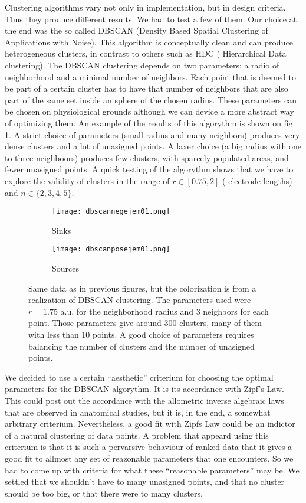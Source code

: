 \documentclass{article}
\begin{document}
Clustering algorithms vary not only in implementation, but in design criteria.
Thus they produce different results. We had to test a few of them. Our choice at the
end was the so called DBSCAN (Density Based Spatial Clustering of Applications with Noise).
This algorithm is conceptually clean and can produce heterogeneous clusters, in contrast
to others such as HDC ( Hierarchical Data clustering). The DBSCAN clustering depends
on two parameters: a radio of neighborhood and a minimal number of neighbors. Each
point that is deemed to be part of a certain cluster has to have that number of neighbors
that are also part of the same set inside an sphere of the chosen radius. These
parameters can be chosen on physiological grounds although we can device a more
abstract way of optimizing them. An example of the results of this
algorythm is shown on fig. \ref{puntoscluster}.
A strict choice of parameters (small radius and many neighbors) produces
very dense clusters and a lot of unasigned points. A laxer choice (a big radius
with one to three neighboors) produces few clusters, with sparcely populated
areas,  and fewer unasigned points. A quick testing of the algorythm 
shows that we have to explore the validity of clusters in the range of
$r \in [0.75, 2 ]$ ( electrode lengths) and $ n \in \lbrace 2,3,4,5 \rbrace$.


\begin{figure}[h]
\centering
\begin{subfigure}{0.40\textwidth}
\texttt{[image: dbscannegejem01.png]}
\caption{Sinks}
\end{subfigure}
\begin{subfigure}{0.40\textwidth}
\texttt{[image: dbscanposejem01.png]}
\caption{Sources}
\end{subfigure}

\caption{Same data as in previous figures, but the colorization is
  from a realization of DBSCAN clustering. The parameters used were
  $r=1.75$ a.u. for the neighborhood radius and 3 neighbors for each point.
  Those parameters give around 300 clusters, many of them with less than
  10 points. A good choice of parameters requires balancing
  the number of clusters and the number of unasigned points. 
}\label{puntoscluster}


\end{figure}


We decided to use a certain ``aesthetic'' criterium for choosing the optimal parameters
for the DBSCAN algorythm.  It is its accordance with Zipf's Law.  This could post out
the accordance with the allometric inverse algebraic laws that are observed in
anatomical studies, but it is, in the end, a somewhat arbitrary criterium.
Nevertheless, a good
fit with Zipfs Law could be an indictor of a natural clustering of data points.
A problem that appeard using this criterium is that it is such a pervarsive
behaviour of ranked data
that it gives a good fit to allmost any set of reazonable parameters
that one encounters. So we had to come up with criteria for what these ``reasonable
parameters'' may be.  We settled that we shouldn't have to many unasigned points, and
that no cluster should be too big, or that there were to many clusters. 
\end{document}
